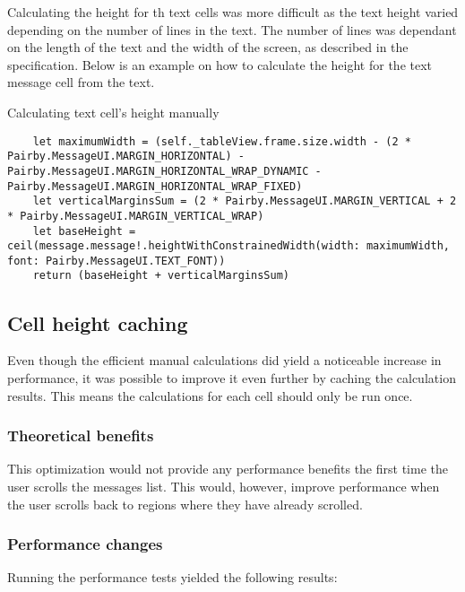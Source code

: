 \documentclass[a4paper,12pt]{article}
\begin{document}
Calculating the height for th text cells was more difficult as the text height varied depending on the number of lines in the text. The number of lines was dependant on the length of the text and the width of the screen, as described in the specification. Below is an example on how to calculate the height for the text message cell from the text.
\begin{listing}[H]
  \caption{Calculating text cell's height manually}
  \begin{verbatim}
    let maximumWidth = (self._tableView.frame.size.width - (2 * Pairby.MessageUI.MARGIN_HORIZONTAL) - Pairby.MessageUI.MARGIN_HORIZONTAL_WRAP_DYNAMIC - Pairby.MessageUI.MARGIN_HORIZONTAL_WRAP_FIXED)
    let verticalMarginsSum = (2 * Pairby.MessageUI.MARGIN_VERTICAL + 2 * Pairby.MessageUI.MARGIN_VERTICAL_WRAP)
    let baseHeight = ceil(message.message!.heightWithConstrainedWidth(width: maximumWidth, font: Pairby.MessageUI.TEXT_FONT))
    return (baseHeight + verticalMarginsSum)
  \end{verbatim}
\end{listing}

\subsection{Cell height caching}
Even though the efficient manual calculations did yield a noticeable increase in performance, it was possible to improve it even further by caching the calculation results. This means the calculations for each cell should only be run once.

\subsubsection*{Theoretical benefits}
This optimization would not provide any performance benefits the first time the user scrolls the messages list. This would, however, improve performance when the user scrolls back to regions where they have already scrolled.

\subsubsection*{Performance changes}
Running the performance tests yielded the following results:
\end{document}

